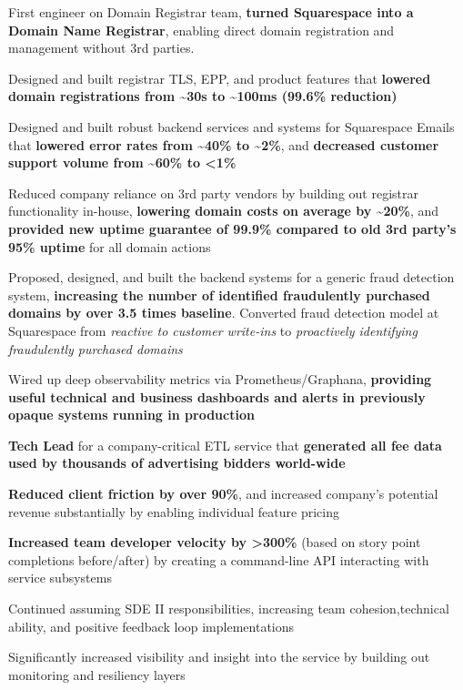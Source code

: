 \documentclass[]{two-column-resume}
\begin{document}
\begin{minipage}[t]{0.65\textwidth}
\begin{tightemize}
\item First engineer on Domain Registrar team, \textbf{turned Squarespace into a Domain Name Registrar}, enabling direct domain registration and management without 3rd parties.
\item Designed and built registrar TLS, EPP, and product features that \textbf{lowered domain registrations from \textasciitilde 30s to \textasciitilde 100ms (99.6\% reduction)}
\item Designed and built robust backend services and systems for Squarespace Emails that \textbf{lowered error rates from \textasciitilde 40\% to \textasciitilde 2\%}, and \textbf{decreased customer support volume from \textasciitilde 60\% to <1\%}
\item Reduced company reliance on 3rd party vendors by building out registrar functionality in-house, \textbf{lowering domain costs on average by \textasciitilde 20\%}, and \textbf{provided new uptime guarantee of 99.9\% compared to old 3rd party's 95\% uptime} for all domain actions
\item Proposed, designed, and built the backend systems for a generic fraud detection system, \textbf{increasing the number of identified fraudulently purchased domains by over 3.5 times baseline}. Converted fraud detection model at Squarespace from \textit{reactive to customer write-ins} to \textit{proactively identifying fraudulently purchased domains}
\item Wired up deep observability metrics via Prometheus/Graphana, \textbf{providing useful technical and business dashboards and alerts in previously opaque systems running in production}
\end{tightemize}
\sectionsep


 \vspace{\topsep} %

\begin{tightemize}
\item \textbf{Tech Lead} for a company-critical ETL service that \textbf{generated all fee data used by thousands of advertising bidders world-wide}
\item \textbf{Reduced client friction by over 90\%}, and increased
company's potential revenue substantially by enabling individual feature pricing
\item {\bf Increased team developer velocity by >300\%} (based on story point
completions before/after) by creating a command-line API interacting
with service subsystems
\item Continued assuming SDE II responsibilities, increasing team cohesion,technical ability, and positive feedback loop implementations
\item Significantly increased visibility and insight into the service by building out monitoring and resiliency layers
\end{tightemize}
\sectionsep


\end{minipage}
\end{document}
